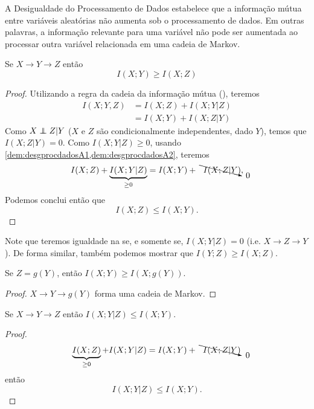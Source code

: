 A Desigualdade do Processamento de Dados estabelece que a informação mútua
entre variáveis aleatórias não aumenta sob o processamento de dados. Em outras
palavras, a informação relevante para uma variável não pode ser aumentada ao
processar outra variável relacionada em uma cadeia de Markov.
\begin{theorem}\label{thm:desgprocdados}
Se $X \rightarrow Y \rightarrow Z$ então
\begin{equation}\label{eq:desgprocdados}
I(X;Y) \geq I(X;Z)
\end{equation}
\end{theorem}
\begin{proof}
Utilizando a regra da cadeia da informação mútua (), teremos
\begin{subequations}\label{dem:desgprocdadosA}
  \begin{align}
    I(X;Y,Z) &= I(X;Z) + I(X;Y|Z) \label{dem:desgprocdadosA1}\\
             &= I(X;Y) + I(X;Z|Y) \label{dem:desgprocdadosA2}
  \end{align}
\end{subequations}
Como $X \independent Z |Y$ ($X$ e $Z$ são condicionalmente independentes, dado $Y$), temos
que $I(X;Z|Y)=0$. Como $I(X;Y|Z) \geq 0$, usando \cref{dem:desgprocdadosA1,dem:desgprocdadosA2}, teremos
\begin{equation}
I(X;Z) + \underbrace{I(X; Y|Z)}_{\geq 0} = I(X;Y) + \bcancelto{0}{I(X;Z|Y)} ,
\end{equation}
Podemos conclui então que
\begin{equation}
I(X;Z) \leq I(X;Y) .
\end{equation}
\end{proof}
Note que teremos igualdade na  se, e somente se, $I(X;Y|Z)=0$ (i.e. $X \rightarrow Z \rightarrow Y$).
De forma similar, também podemos mostrar que $I(Y;Z) \geq I(X;Z)$.

\begin{corollary}
Se $Z=g(Y)$, então $I(X;Y) \geq I(X;g(Y))$.
\end{corollary}
\begin{proof}
$X \rightarrow Y \rightarrow g(Y)$ forma uma cadeia de Markov.
\end{proof}

\begin{corollary}\label{col:infmutxyzleq}
Se $X \rightarrow Y \rightarrow Z$ então $I(X;Y|Z) \leq I(X;Y)$.
\end{corollary}
\begin{proof}
\begin{equation}
\underbrace{I(X;Z)}_{\geq 0} + I(X; Y|Z) = I(X;Y) + \bcancelto{0}{I(X;Z|Y)}
\end{equation}
então
\begin{equation}
I(X; Y|Z) \leq I(X;Y).
\end{equation}
\end{proof}

